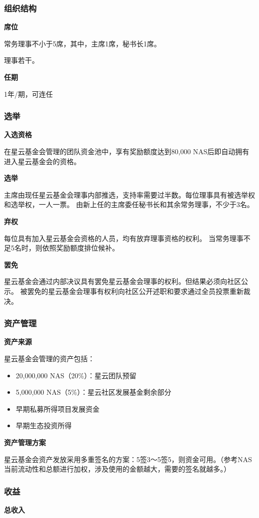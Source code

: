 \subsubsection{组织结构}
\textbf{席位}

常务理事不小于5席，其中，主席1席，秘书长1席。

理事若干。

\textbf{任期}

1年/期，可连任

\subsubsection{选举}
\textbf{入选资格}

在星云基金会管理的团队资金池中，享有奖励额度达到80,000 NAS后即自动拥有进入星云基金会的资格。

\textbf{选举}

主席由现任星云基金会理事内部推选，支持率需要过半数。每位理事具有被选举权和选举权，一人一票。
由新上任的主席委任秘书长和其余常务理事，不少于3名。

\textbf{弃权}

每位具有加入星云基金会资格的人员，均有放弃理事资格的权利。
当常务理事不足5名时，则依照奖励额度排位候补。

\textbf{罢免}

星云基金会通过内部决议具有罢免星云基金会理事的权利。但结果必须向社区公示。
被罢免的星云基金会理事有权利向社区公开述职和要求通过全员投票重新裁决。

\subsubsection{资产管理}

\textbf{资产来源}

星云基金会管理的资产包括：
\begin{itemize}
	\item 20,000,000 NAS（20\%）：星云团队预留
\item  5,000,000 NAS（5\%）：星云社区发展基金剩余部分
\item 早期私募所得项目发展资金
\item 早期生态投资所得
\end{itemize}

\textbf{资产管理方案}

星云基金会资产发放采用多重签名的方案：5签3～5签5，则资金可用。（参考NAS当前流动性和总额进行加权，涉及使用的金额越大，需要的签名就越多。）

\subsubsection{收益}
\textbf{总收入}

